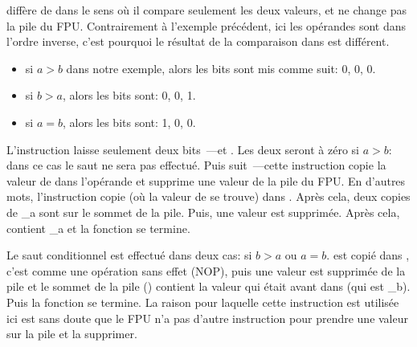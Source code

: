 



\FCOM diffère de \FCOMP dans le sens où il compare seulement les deux valeurs, et
ne change pas la pile du FPU.
Contrairement à l'exemple précédent, ici les opérandes sont dans l'ordre inverse,
c'est pourquoi le résultat de la comparaison dans \CThreeBits est différent.

\begin{itemize}
\item si $a>b$ dans notre exemple, alors les bits \CThreeBits sont mis comme suit: 0, 0, 0.
\item si $b>a$, alors les bits sont: 0, 0, 1.
\item si $a=b$, alors les bits sont: 1, 0, 0.
\end{itemize}

L'instruction  laisse seulement deux bits~---\Cthree et \Czero.
Les deux seront à zéro si $a>b$: dans ce cas le saut \JNE ne sera pas effectué.
Puis  suit~---cette instruction copie la valeur de  dans l'opérande
et supprime une valeur de la pile du FPU.
En d'autres mots, l'instruction copie  (où la valeur de  se trouve)
dans .
Après cela, deux copies de {\_a} sont sur le sommet de la pile.
Puis, une valeur est supprimée.
Après cela,  contient {\_a} et la fonction se termine.

Le saut conditionnel \JNE est effectué dans deux cas: si $b>a$ ou $a=b$.
 est copié dans , c'est comme une opération sans effet (\ac{NOP}), puis
une valeur est supprimée de la pile et le sommet de la pile () contient la
valeur qui était avant dans  (qui est {\_b}).
Puis la fonction se termine.
La raison pour laquelle cette instruction est utilisée ici est sans doute que le
\ac{FPU} n'a pas d'autre instruction pour prendre une valeur sur la pile et la
supprimer.


